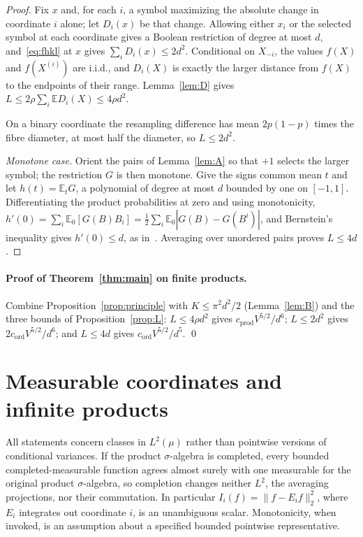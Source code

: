 \documentclass[11pt]{article}
\numberwithin{equation}{section}
\newcommand{\E}{\mathbb{E}}
\newcommand{\Cgen}{c_{\mathrm{prod}}}
\newcommand{\Cmon}{c_{\mathrm{ord}}}
\theoremstyle{plain}
\theoremstyle{remark}
\begin{document}
\begin{proof}
Fix $x$ and, for each $i$, a symbol maximizing the absolute change in coordinate $i$ alone; let $D_i(x)$ be that change. Allowing either $x_i$ or the selected symbol at each coordinate gives a Boolean restriction of degree at most $d$, and~\eqref{eq:fhkl} at $x$ gives $\sum_iD_i(x)\le2d^2$. Conditional on $X_{-i}$, the values $f(X)$ and $f(X^{(i)})$ are i.i.d., and $D_i(X)$ is exactly the larger distance from $f(X)$ to the endpoints of their range. Lemma~\ref{lem:D} gives $L\le2\rho\sum_i\E D_i(X)\le4\rho d^2$.

On a binary coordinate the resampling difference has mean $2p(1-p)$ times the fibre diameter, at most half the diameter, so $L\le 2d^2$.

\emph{Monotone case.} Orient the pairs of Lemma~\ref{lem:A} so that $+1$ selects the larger symbol; the restriction $G$ is then monotone. Give the signs common mean $t$ and let $h(t)=\E_tG$, a polynomial of degree at most $d$ bounded by one on $[-1,1]$. Differentiating the product probabilities at zero and using monotonicity, $h'(0)=\sum_i\E_0[G(B)B_i]=\tfrac12\sum_i\E_0|G(B)-G(B^i)|$, and Bernstein's inequality gives $h'(0)\le d$, as in~\cite[Lemma~3.15]{FHKL16}. Averaging over unordered pairs proves $L\le4d$.
\end{proof}

\paragraph{Proof of Theorem~\ref{thm:main} on finite products.} Combine Proposition~\ref{prop:principle} with $K\le\pi^2d^2/2$ (Lemma~\ref{lem:B}) and the three bounds of Proposition~\ref{prop:L}: $L\le4\rho d^2$ gives $\Cgen V^{5/2}/d^6$; $L\le 2d^2$ gives $2\Cmon V^{5/2}/d^6$; and $L\le4d$ gives $\Cmon V^{5/2}/d^5$. \qed

\section{Measurable coordinates and infinite products}\label{sec:measurable}
All statements concern classes in $L^2(\mu)$ rather than pointwise versions of conditional variances. If the product $\sigma$-algebra is completed, every bounded completed-measurable function agrees almost surely with one measurable for the original product $\sigma$-algebra, so completion changes neither $L^2$, the averaging projections, nor their commutation. In particular $I_i(f)=\|f-E_if\|_2^2$, where $E_i$ integrates out coordinate $i$, is an unambiguous scalar. Monotonicity, when invoked, is an assumption about a specified bounded pointwise representative.
\end{document}
